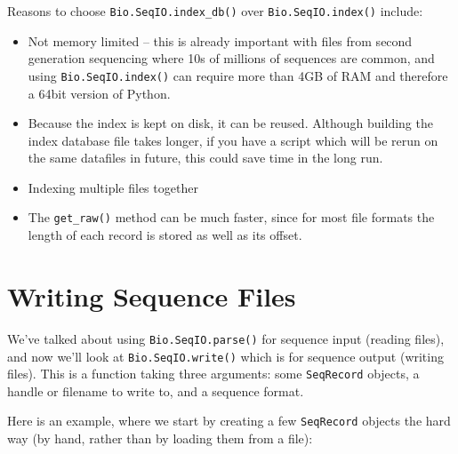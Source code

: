 \documentclass{report}
\begin{document}
Reasons to choose \verb|Bio.SeqIO.index_db()| over \verb|Bio.SeqIO.index()|
include:
\begin{itemize}
\item Not memory limited -- this is already important with files from second
generation sequencing where 10s of millions of sequences are common, and
using \verb|Bio.SeqIO.index()| can require more than 4GB of RAM and therefore
a 64bit version of Python.
\item Because the index is kept on disk, it can be reused. Although building
the index database file takes longer, if you have a script which will be
rerun on the same datafiles in future, this could save time in the long run.
\item Indexing multiple files together
\item The \verb|get_raw()| method can be much faster, since for most file
formats the length of each record is stored as well as its offset.
\end{itemize}

\section{Writing Sequence Files}

We've talked about using \verb|Bio.SeqIO.parse()| for sequence input (reading files), and now we'll look at \verb|Bio.SeqIO.write()| which is for sequence output (writing files).  This is a function taking three arguments: some \verb|SeqRecord| objects, a handle or filename to write to, and a sequence format.

Here is an example, where we start by creating a few \verb|SeqRecord| objects the hard way (by hand, rather than by loading them from a file):
\end{document}
